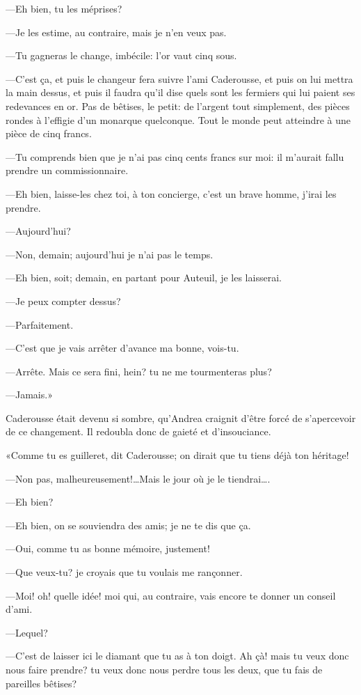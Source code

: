 —Eh bien, tu les méprises? 

—Je les estime, au contraire, mais je n'en veux pas. 

—Tu gagneras le change, imbécile: l'or vaut cinq sous. 

—C'est ça, et puis le changeur fera suivre l'ami Caderousse, et puis on lui mettra la main dessus, et puis il faudra qu'il dise quels sont les fermiers qui lui paient ses redevances en or. Pas de bêtises, le petit: de l'argent tout simplement, des pièces rondes à l'effigie d'un monarque quelconque. Tout le monde peut atteindre à une pièce de cinq francs. 

—Tu comprends bien que je n'ai pas cinq cents francs sur moi: il m'aurait fallu prendre un commissionnaire. 

—Eh bien, laisse-les chez toi, à ton concierge, c'est un brave homme, j'irai les prendre. 

—Aujourd'hui? 

—Non, demain; aujourd'hui je n'ai pas le temps. 

—Eh bien, soit; demain, en partant pour Auteuil, je les laisserai. 

—Je peux compter dessus? 

—Parfaitement. 

—C'est que je vais arrêter d'avance ma bonne, vois-tu. 

—Arrête. Mais ce sera fini, hein? tu ne me tourmenteras plus? 

—Jamais.» 

Caderousse était devenu si sombre, qu'Andrea craignit d'être forcé de s'apercevoir de ce changement. Il redoubla donc de gaieté et d'insouciance. 

«Comme tu es guilleret, dit Caderousse; on dirait que tu tiens déjà ton héritage! 

—Non pas, malheureusement!\dots Mais le jour où je le tiendrai\dots. 

—Eh bien? 

—Eh bien, on se souviendra des amis; je ne te dis que ça. 

—Oui, comme tu as bonne mémoire, justement!  

—Que veux-tu? je croyais que tu voulais me rançonner. 

—Moi! oh! quelle idée! moi qui, au contraire, vais encore te donner un conseil d'ami. 

—Lequel? 

—C'est de laisser ici le diamant que tu as à ton doigt. Ah çà! mais tu veux donc nous faire prendre? tu veux donc nous perdre tous les deux, que tu fais de pareilles bêtises? 

